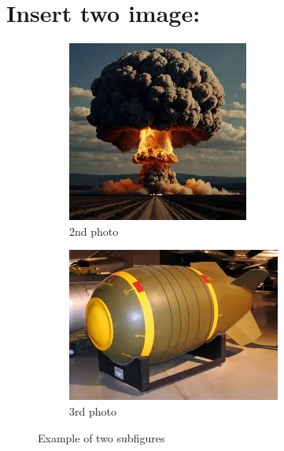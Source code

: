 \documentclass{article}
\begin{document}
	\section{Insert two image:}
    \begin{figure}[htbp]
	\centering
	\begin{subfigure}[b]{0.4\textwidth} %
		\centering
		\includegraphics[height=.73\textwidth]{second.jpg}
		\caption{2nd photo}
		\label{fig:second}
	\end{subfigure}
	\hspace{0.05\textwidth} %
	\begin{subfigure}[b]{0.4\textwidth} %
		\centering
		\includegraphics[width=\textwidth]{third.jpg}
		\caption{3rd photo}
		\label{fig:third}
	\end{subfigure}
	\caption{Example of two subfigures}
	\label{fig:example}
\end{figure}
\end{document}

